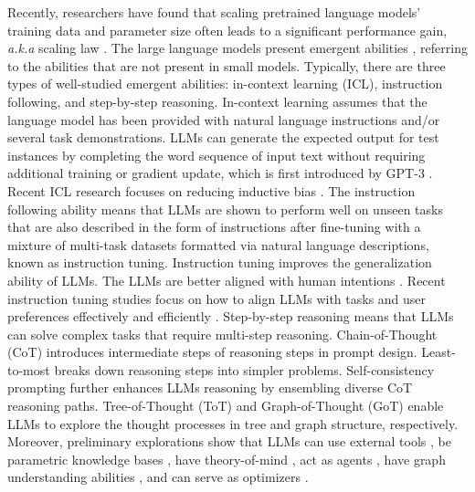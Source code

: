\documentclass[11pt]{article}
\begin{document}
Recently, researchers have found that scaling pretrained language models' training data and parameter size often leads to a significant performance gain, \emph{a.k.a} scaling law \cite{kaplan2020scaling}. The large language models present emergent abilities \cite{wei2022emergent}, referring to the abilities that are not present in small models. Typically, there are three types of well-studied emergent abilities: in-context learning (ICL), instruction following, and step-by-step reasoning. In-context learning assumes that the language model has been provided with natural language instructions and/or several task demonstrations. LLMs can generate the expected output for test instances by completing the word sequence of input text without requiring additional training or gradient update, which is first introduced by GPT-3 \cite{brown2020language}. Recent ICL research focuses on reducing inductive bias \cite{levine2021inductive,si2023measuring}. The instruction following ability means that LLMs are shown to perform well on unseen tasks that are also described in the form of instructions after fine-tuning with a mixture of multi-task datasets formatted via natural language descriptions, known as instruction tuning. Instruction tuning improves the generalization ability of LLMs. The LLMs are better aligned with human intentions \cite{wang2023aligning}. Recent instruction tuning studies focus on how to align LLMs with tasks and user preferences effectively \cite{ouyang2022training} and efficiently \cite{zhou2023lima}. Step-by-step reasoning means that LLMs can solve complex tasks that require multi-step reasoning. Chain-of-Thought (CoT) \cite{wei2022chain} introduces intermediate steps of reasoning steps in prompt design. Least-to-most \cite{zhou2022least} breaks down reasoning steps into simpler problems. Self-consistency \cite{wang2022self} prompting further enhances LLMs reasoning by ensembling diverse CoT reasoning paths.
Tree-of-Thought (ToT) \cite{yao2023tree} and Graph-of-Thought (GoT) \cite{yao2023beyond, besta2023graph} enable LLMs to explore the thought processes in tree and graph structure, respectively. Moreover, preliminary explorations show that LLMs can use external tools \cite{schick2023toolformer}, be parametric knowledge bases \cite{pan2023unifying}, have theory-of-mind \cite{kosinski2023theory}, act as agents \cite{wang2023survey, xi2023rise}, have graph understanding abilities \cite{wang2023can}, and can serve as optimizers \cite{yang2023large}.
\end{document}
